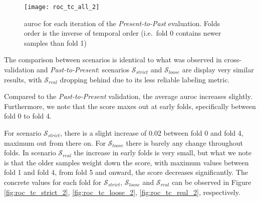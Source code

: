 \begin{figure}[!h]
	\centering
	\texttt{[image: roc\_tc\_all\_2]}
	\caption{\gls{auroc} for each iteration of the \textit{Present-to-Past} evaluation. Folds order is the inverse of temporal order (i.e.\ fold 0 contains newer samples than fold 1)}
	\label{fig:roc_tc_2}
\end{figure}

The comparison between scenarios is identical to what was observed in cross-validation and \textit{Past-to-Present}: scenarios $\mathcal{S}_{strict}$ and $\mathcal{S}_{loose}$ are display very similar results, with $\mathcal{S}_{real}$ dropping behind due to its less reliable labeling metric.

Compared to the \textit{Past-to-Present} validation, the average \gls{auroc} increases slightly. Furthermore, we note that the score maxes out at early folds, specifically between fold 0 to fold 4.

For scenario $\mathcal{S}_{strict}$, there is a slight increase of 0.02 between fold 0 and fold 4, maximum out from there on. For $\mathcal{S}_{loose}$ there is barely any change throughout folds. In scenario $\mathcal{S}_{real}$ the increase in early folds is very small, but what we note is that the older samples weight down the score, with maximum values between fold 1 and fold 4, from fold 5 and onward, the score decreases significantly. The concrete values for each fold for $\mathcal{S}_{strict}$, $\mathcal{S}_{loose}$ and $\mathcal{S}_{real}$ can be observed in Figure \ref{fig:roc_tc_strict_2}, \ref{fig:roc_tc_loose_2}, \ref{fig:roc_tc_real_2}, respectively.



